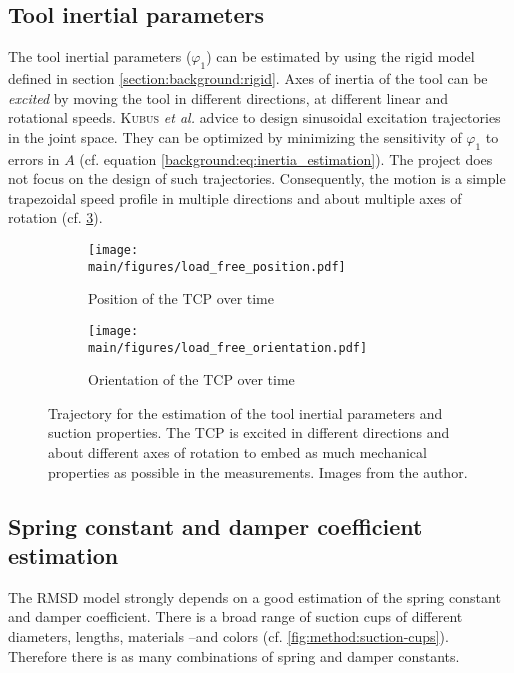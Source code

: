 \documentclass[/home/francois/latex/report/main.tex]{subfiles}
\begin{document}
\subsection{Tool inertial parameters}

The tool inertial parameters ($\varphi_1$) can be estimated by using the rigid model defined in section \ref{section:background:rigid}. Axes of inertia of the tool can be \textit{excited} by moving the tool in different directions, at different linear and rotational speeds. \textsc{Kubus} \textit{et al.} \cite{Kubus2008} advice to design sinusoidal excitation trajectories in the joint space. They can be optimized by minimizing the sensitivity of $\varphi_1$ to errors in $A$ (cf. equation \ref{background:eq:inertia_estimation}). The project does not focus on the design of such trajectories. Consequently, the motion is a simple trapezoidal speed profile in multiple directions and about multiple axes of rotation (cf. \ref{fig:method:trajectory}).

\begin{figure}[h]
\centering
\begin{subfigure}{\textwidth}
\centering
\texttt{[image: \\main/figures/load\_free\_position.pdf]}
\caption{Position of the \ac{TCP} over time}
\label{fig:method:position}
\end{subfigure}
\begin{subfigure}{\textwidth}
\centering
\texttt{[image: \\main/figures/load\_free\_orientation.pdf]}
\caption{Orientation of the \ac{TCP} over time}
\label{fig:method:orientation}
\end{subfigure}
\caption{Trajectory for the estimation of the tool inertial parameters and suction properties. The \ac{TCP} is excited in different directions and about different axes of rotation to embed as much mechanical properties as possible in the measurements. Images from the author.}
\label{fig:method:trajectory}
\end{figure}

\subsection{Spring constant and damper coefficient estimation}

The \ac{RMSD} model strongly depends on a good estimation of the spring constant and damper coefficient. There is a broad range of suction cups of different diameters, lengths, materials –and colors (cf. \ref{fig:method:suction-cups}). Therefore there is as many combinations of spring and damper constants.
\end{document}
